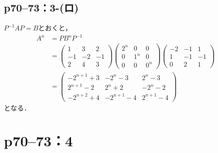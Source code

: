 \documentclass[a4paper,10pt,fleqn]{ltjsarticle}
\begin{document}
\subsection*{p70--73：3-(ロ)}


\begin{tleftbar}
    $P^{-1} A P = B$とおくと，
    \begin{align*}
        A^n & = P B^n P^{-1}                                                                                                                                                                                                      \\
            & = \begin{pmatrix} 1 & 3 & 2 \\ -1 & -2 & -1 \\ 2 & 4 & 3 \end{pmatrix} \begin{pmatrix} 2^n & 0 & 0 \\ 0 & 1^n & 0 \\ 0 & 0 & 0^n \end{pmatrix} \begin{pmatrix} -2 & -1 & 1\\ 1 & -1 & -1 \\ 0 & 2 & 1 \end{pmatrix} \\
            & = \begin{pmatrix} -2^{n+1}+3 & -2^n -3 & 2^n -3 \\ 2^{n+1}-2 & 2^n +2 & -2^n -2 \\ -2^{n+2}+4 & -2^{n+1} -4 & 2^{n+1} -4 \end{pmatrix}
    \end{align*}
    となる．
\end{tleftbar}
\newpage


\section*{p70--73：4}
\end{document}
